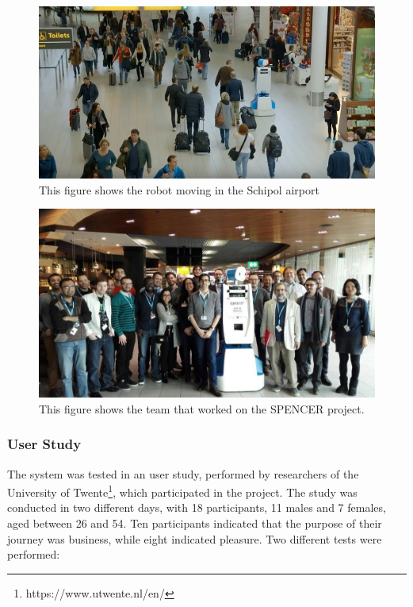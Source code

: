 \begin{figure}[ht!]
	\centering
	\includegraphics[scale=0.45]{img/case_study/spencer/spencer_schiphol.png}
	\caption{This figure shows the robot moving in the Schipol airport}
	\label{fig:case_study-spencer-spencer_moving}
\end{figure}


\begin{figure}[ht!]
	\centering
	\includegraphics[scale=0.45]{img/case_study/spencer/all.jpg}
	\caption{This figure shows the team that worked on the SPENCER project.}
	\label{fig:case_study-spencer-team}
\end{figure}

\subsubsection{User Study}

The system was tested in an user study, performed by researchers of the University of Twente\footnote{https://www.utwente.nl/en/}, which participated in the project. The study was conducted in two different days, with 18 participants, 11 males and 7 females, aged between 26 and 54. Ten participants indicated that the purpose of their journey was business, while eight indicated pleasure. Two different tests were performed:

